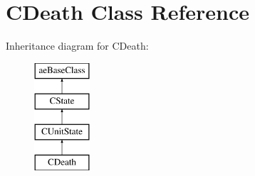 \hypertarget{class_c_death}{}\section{C\+Death Class Reference}
\label{class_c_death}
Inheritance diagram for C\+Death\+:\begin{figure}[H]
\begin{center}
\leavevmode
\includegraphics[height=4.000000cm]{class_c_death}
\end{center}
\end{figure}
